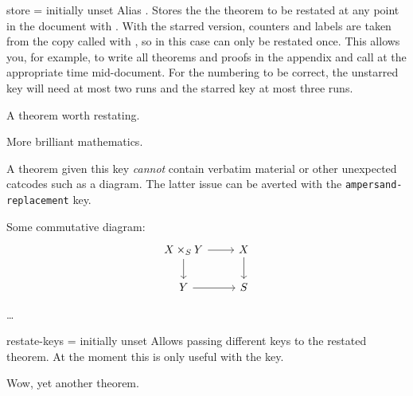 \documentclass{ltxdoc}
\begin{document}
\begin{docKey}{store}
  {\sarg=}
  {initially unset}
Alias \sarg.
Stores the the theorem to be restated at any point in the document with .
With the starred version, counters and labels are taken from the copy called with , so in this case can only be restated once.
This allows you, for example, to write all theorems and proofs in the appendix and call  at the appropriate time mid-document.
For the numbering to be correct, the unstarred key will need at most two runs and the starred key at most three runs.

\begin{keythmscode}[]
\begin{theorem}[store=blub]
A theorem worth restating.
\end{theorem}
More brilliant mathematics.
\end{keythmscode}

A theorem given this key \emph{cannot} contain verbatim material or other unexpected catcodes such as a  diagram.
The latter issue can be averted with the \texttt{ampersand-replacement} key.

\begin{codepreamble}
\usepackage{tikz}
\usetikzlibrary{cd}
\end{codepreamble}

\begin{keythmscode}[withpreamble]
\begin{lemma}[store=diagram]
Some commutative diagram:
\[\begin{tikzcd}[ampersand replacement=\&]
    X\times_S Y \ar[r] \ar[d] \& X \ar[d] \\
    Y \ar[r] \& S
\end{tikzcd}\]
\end{lemma}
\dots
{}
\end{keythmscode}

\end{docKey}

\begin{docKey}{restate-keys}
  {=}
  {initially unset}
Allows passing different keys to the restated theorem.
At the moment this is only useful with the  key.

\begin{keythmscode}[]
\begin{theorem}[
  store=rktest,
  note=ORIGINAL,
  restate-keys={note=RESTATED}]
Wow, yet another theorem.
\end{theorem}
\end{keythmscode}

\end{docKey}
\end{document}

